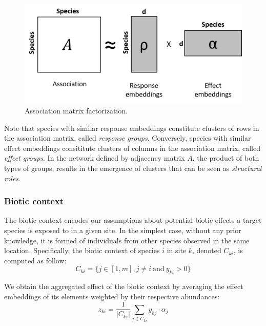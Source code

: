 \documentclass[]{article}
\newcommand{\commG}[1]{#1}
\newcommand{\abs}[1]{\left\lvert#1\right\rvert}
\newcommand{\spc}{i}
\newcommand{\ospc}{j}
\newcommand{\site}{k}
\newcommand{\AssMat}{A}
\newcommand{\BioCont}{C}
\newcommand{\BioEff}{z}
\newcommand{\abdv}{y}
\begin{document}
\begin{figure}[h]
	\centering
	\commG{\includegraphics[scale=0.5]{factorization}}
	\caption{Association matrix factorization.}
	\label{factoriz}
\end{figure}

Note that species with similar response embeddings constitute clusters of rows in the association matrix, called \emph{response groups}. Conversely, species with similar effect embeddings consititute clusters of columns in the association matrix, called \textit{effect groups}.
In the network defined by adjacency matrix $\AssMat$, the product of both types of groups, results in the emergence of clusters that can be seen as \emph{structural roles}. 

\subsubsection{Biotic context}
The biotic context encodes our assumptions about potential biotic effects a target species is exposed to in a given site. In the simplest case, without any prior knowledge, it is formed of individuals from other species observed in the same location. Specifically, the biotic context of species $\spc$ in site $\site$, denoted $\BioCont_{\site\spc}$, is computed as follow:
\begin{equation*}
\BioCont_{\site\spc} = \{\ospc \in [1,m], \ospc \neq \spc ~\text{and}~ \abdv_{\site\spc} > 0 \}
\end{equation*}

We obtain the aggregated effect of the biotic context by averaging the effect embeddings of its elements weighted by their respective abundances:   
\begin{equation*}
\BioEff_{\site\spc} = \frac{1}{\abs{\BioCont_{\site\spc}}} \sum_{\ospc \in \BioCont_{\site\spc}} \abdv_{\site\ospc} \cdot \alpha_{\ospc}
\end{equation*}
\end{document}
